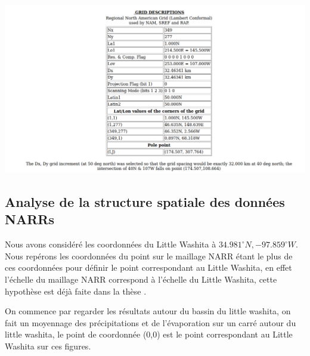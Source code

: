 \documentclass[a4paper,10pt]{article}
\begin{document}
\begin{center}
	\label{maillage NARR}
	\includegraphics[scale=0.4]{grid_prop.png}
\end{center} 

\subsection{Analyse de la structure spatiale des données NARRs}
Nous avons considéré les coordonnées du Little Washita à $34.981^{\circ}N,-97.859^{\circ}W$. Nous repérons les coordonnées du point sur le maillage NARR étant le plus de ces coordonnées pour définir le point correspondant au Little Washita, en effet l'échelle du maillage NARR correspond à l'échelle du Little Washita, cette hypothèse est déjà faite dans la thèse \cite{maquin2016developpement}. 

On commence par regarder les résultats autour du bassin du little washita, on fait un moyennage des précipitations et de l'évaporation sur un carré autour du little washita, le point de coordonnée (0,0) est le point correspondant au Little Washita sur ces figures. 
\end{document}
